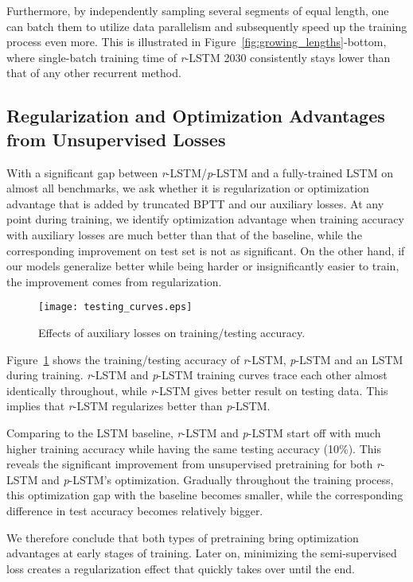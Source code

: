 \documentclass{article}
\newcommand{\rlstm}{{\it r}-LSTM}
\newcommand{\plstm}{{\it p}-LSTM}
\begin{document}
Furthermore, by independently sampling several segments of equal length, one can batch them to utilize data parallelism and subsequently speed up the training process even more. This is illustrated in Figure~\ref{fig:growing_lengths}-bottom, where single-batch training time of \rlstm{} 2030 consistently stays lower than that of any other recurrent method.

\subsection{Regularization and Optimization Advantages from Unsupervised Losses} \label{sec:reg_or_opt}

With a significant gap between \rlstm{}/\plstm{} and a fully-trained LSTM on almost all benchmarks, we ask whether it is regularization or optimization advantage that is added by truncated BPTT and our auxiliary losses. At any point during training, we identify optimization advantage when training accuracy with auxiliary losses are much better than that of the baseline, while the corresponding improvement on test set is not as significant. On the other hand, if our models generalize better while being harder or insignificantly easier to train, the improvement comes from regularization.

\begin{figure}[htb]
\texttt{[image: testing\_curves.eps]}
\caption{Effects of auxiliary losses on training/testing accuracy.}
\label{fig:testing_curves}
\end{figure}



Figure~\ref{fig:testing_curves} shows the training/testing accuracy of \rlstm{}, \plstm{} and an LSTM during training. \rlstm{} and \plstm{} training curves trace each other almost identically throughout, while \rlstm{} gives better result on testing data. This implies that \rlstm{} regularizes better than \plstm{}.


Comparing to the LSTM baseline, \rlstm{} and \plstm{} start off with much higher training accuracy while having the same testing accuracy (10\%). This reveals the significant improvement from unsupervised pretraining for both \rlstm{} and \plstm{}'s optimization. Gradually throughout the training process, this optimization gap with the baseline becomes smaller, while the corresponding difference in test accuracy becomes relatively bigger.

We therefore conclude that both types of pretraining bring optimization advantages at early stages of training. Later on, minimizing the semi-supervised loss creates a regularization effect that quickly takes over until the end.
\end{document}
